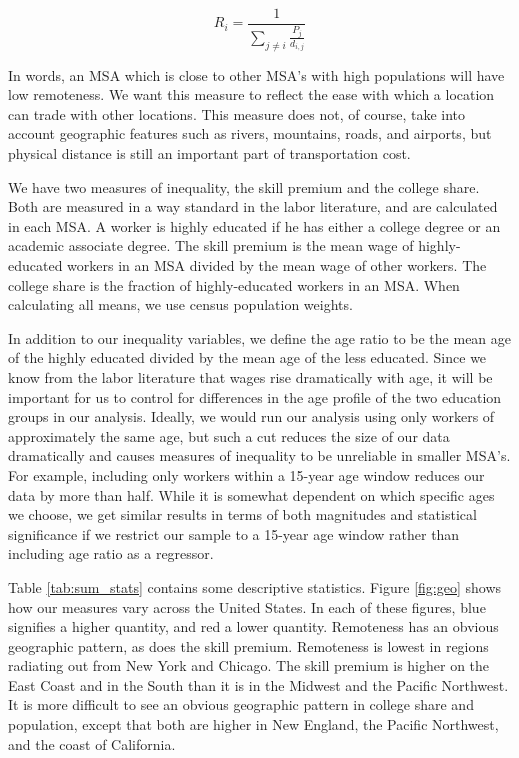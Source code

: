 \documentclass{article}
\begin{document}
\begin{equation}
    R_i = \frac{1}{\sum_{j\neq i} \frac{P_j}{d_{i,j}}} \nonumber
    \label{eq:rem}
\end{equation}

In words, an MSA which is close to other MSA's with high populations will have low remoteness.  We want this measure to reflect the ease with which a location can trade with other locations.  This measure does not, of course, take into account geographic features such as rivers, mountains, roads, and airports, but physical distance is still an important part of transportation cost.  

We have two measures of inequality, the skill premium and the college share.  Both are measured in a way standard in the labor literature, and are calculated in each MSA.  A worker is highly educated if he has either a college degree or an academic associate degree.  The skill premium is the mean wage of highly-educated workers in an MSA divided by the mean wage of other workers.  The college share is the fraction of highly-educated workers in an MSA.  When calculating all means, we use census population weights.

In addition to our inequality variables, we define the age ratio to be the mean age of the highly educated divided by the mean age of the less educated.  Since we know from the labor literature that wages rise dramatically with age, it will be important for us to control for differences in the age profile of the two education groups in our analysis.  Ideally, we would run our analysis using only workers of approximately the same age, but such a cut reduces the size of our data dramatically and causes measures of inequality to be unreliable in smaller MSA's.  For example, including only workers within a 15-year age window reduces our data by more than half.  While it is somewhat dependent on which specific ages we choose, we get similar results in terms of both magnitudes and statistical significance if we restrict our sample to a 15-year age window rather than including age ratio as a regressor.

Table \ref{tab:sum_stats} contains some descriptive statistics.  Figure \ref{fig:geo} shows how our measures vary across the United States. In each of these figures, blue signifies a higher quantity, and red a lower quantity.  Remoteness has an obvious geographic pattern, as does the skill premium.  Remoteness is lowest in regions radiating out from New York and Chicago.  The skill premium is higher on the East Coast and in the South than it is in the Midwest and the Pacific Northwest.  It is more difficult to see an obvious geographic pattern in college share and population, except that both are higher in New England, the Pacific Northwest, and the coast of California.
\end{document}
